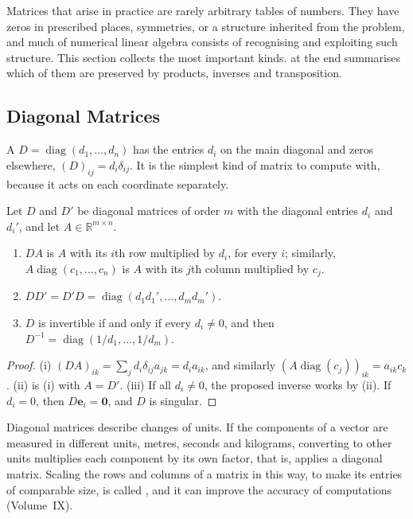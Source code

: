 Matrices that arise in practice are rarely arbitrary tables of numbers. They have zeros in prescribed places, symmetries, or a structure inherited from the problem, and much of numerical linear algebra consists of recognising and exploiting such structure. This section collects the most important kinds.  at the end summarises which of them are preserved by products, inverses and transposition.

\subsection{Diagonal Matrices}

A  $D=\operatorname{diag}(d_1,\ldots,d_n)$ has the entries $d_i$ on the main diagonal and zeros elsewhere, $(D)_{ij}=d_i\delta_{ij}$. It is the simplest kind of matrix to compute with, because it acts on each coordinate separately.

\begin{proposition}
\label{prop:diagonal}
Let $D$ and $D'$ be diagonal matrices of order $m$ with the diagonal entries $d_i$ and $d_i'$, and let $A\in\mathbb R^{m\times n}$.
\begin{enumerate}
\item $DA$ is $A$ with its $i$th row multiplied by $d_i$, for every $i$; similarly, $A\operatorname{diag}(c_1,\ldots,c_n)$ is $A$ with its $j$th column multiplied by $c_j$.
\item $DD'=D'D=\operatorname{diag}(d_1d_1',\ldots,d_md_m')$.
\item $D$ is invertible if and only if every $d_i\ne0$, and then $D^{-1}=\operatorname{diag}(1/d_1,\ldots,1/d_m)$.
\end{enumerate}
\end{proposition}

\begin{proof}
(i) $(DA)_{ik}=\sum_jd_i\delta_{ij}a_{jk}=d_ia_{ik}$, and similarly $(A\operatorname{diag}(c_j))_{ik}=a_{ik}c_k$. (ii) is (i) with $A=D'$. (iii) If all $d_i\ne0$, the proposed inverse works by (ii). If $d_i=0$, then $D\mathbf e_i=\mathbf 0$, and $D$ is singular.
\end{proof}

Diagonal matrices describe changes of units. If the components of a vector are measured in different units, metres, seconds and kilograms, converting to other units multiplies each component by its own factor, that is, applies a diagonal matrix. Scaling the rows and columns of a matrix in this way, to make its entries of comparable size, is called , and it can improve the accuracy of computations (Volume~IX).

